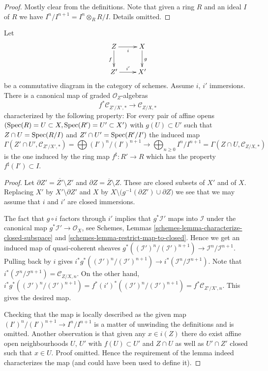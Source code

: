\begin{proof}
Mostly clear from the definitions. Note that given a ring $R$ and
an ideal $I$ of $R$ we have $I^n/I^{n + 1} = I^n \otimes_R R/I$.
Details omitted.
\end{proof}

\begin{lemma}
\label{lemma-conormal-algebra-functorial}
Let
$$
\xymatrix{
Z \ar[r]_i \ar[d]_f & X \ar[d]^g \\
Z' \ar[r]^{i'} & X'
}
$$
be a commutative diagram in the category of schemes.
Assume $i$, $i'$ immersions. There is a canonical map
of graded $\mathcal{O}_Z$-algebras
$$
f^*\mathcal{C}_{Z'/X', *}
\longrightarrow
\mathcal{C}_{Z/X, *}
$$
characterized by the following property: For every pair of affine opens
$(\mathop{\mathrm{Spec}}(R) = U \subset X, \mathop{\mathrm{Spec}}(R') = U' \subset X')$ with
$g(U) \subset U'$ such that
$Z \cap U = \mathop{\mathrm{Spec}}(R/I)$ and $Z' \cap U' = \mathop{\mathrm{Spec}}(R'/I')$
the induced map
$$
\Gamma(Z' \cap U', \mathcal{C}_{Z'/X', *}) =
\bigoplus\nolimits (I')^n/(I')^{n + 1}
\longrightarrow
\bigoplus\nolimits_{n \geq 0} I^n/I^{n + 1} =
\Gamma(Z \cap U, \mathcal{C}_{Z/X, *})
$$
is the one induced by the ring map $f^\sharp : R' \to R$ which
has the property $f^\sharp(I') \subset I$.
\end{lemma}

\begin{proof}
Let $\partial Z' = \overline{Z'} \setminus Z'$ and
$\partial Z = \overline{Z} \setminus Z$. These are closed subsets of $X'$ and
of $X$. Replacing $X'$ by $X' \setminus \partial Z'$ and $X$ by
$X \setminus \big(g^{-1}(\partial Z') \cup \partial Z\big)$ we
see that we may assume that $i$ and $i'$ are closed immersions.

\medskip\noindent
The fact that $g \circ i$ factors through $i'$ implies that
$g^*\mathcal{I}'$ maps into $\mathcal{I}$ under the canonical
map $g^*\mathcal{I}' \to \mathcal{O}_X$, see
Schemes, Lemmas
\ref{schemes-lemma-characterize-closed-subspace} and
\ref{schemes-lemma-restrict-map-to-closed}.
Hence we get an induced map of quasi-coherent sheaves
$g^*((\mathcal{I}')^n/(\mathcal{I}')^{n + 1}) \to
\mathcal{I}^n/\mathcal{I}^{n + 1}$.
Pulling back by $i$ gives
$i^*g^*((\mathcal{I}')^n/(\mathcal{I}')^{n + 1}) \to
i^*(\mathcal{I}^n/\mathcal{I}^{n + 1})$.
Note that
$i^*(\mathcal{I}^n/\mathcal{I}^{n + 1}) = \mathcal{C}_{Z/X, n}$.
On the other hand,
$i^*g^*((\mathcal{I}')^n/(\mathcal{I}')^{n + 1}) =
f^*(i')^*((\mathcal{I}')^n/(\mathcal{I}')^{n + 1}) =
f^*\mathcal{C}_{Z'/X', n}$.
This gives the desired map.

\medskip\noindent
Checking that the map is locally described as the given map
$(I')^n/(I')^{n + 1} \to I^n/I^{n + 1}$ is a matter of unwinding the
definitions and is omitted. Another observation is that given any
$x \in i(Z)$ there do exist affine open neighbourhoods $U$, $U'$
with $f(U) \subset U'$ and $Z \cap U$ as well as $U' \cap Z'$
closed such that $x \in U$. Proof omitted. Hence the requirement
of the lemma indeed characterizes the map (and could have been used
to define it).
\end{proof}

